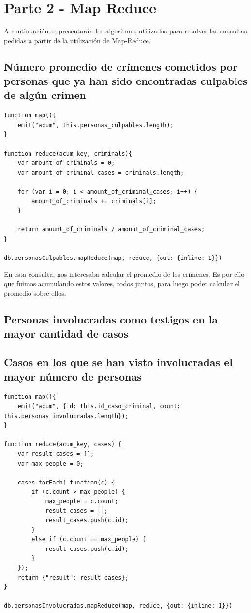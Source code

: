 \documentclass[10pt,a4paper]{article}
\begin{document}
\section{Parte 2 - Map Reduce}
A continuación se presentarán los algoritmos utilizados para resolver las consultas pedidas a partir de la utilización de Map-Reduce.

\subsection{Número promedio de crímenes cometidos por personas que ya han sido encontradas culpables de algún crimen}

\begin{lstlisting}
function map(){
	emit("acum", this.personas_culpables.length);
}

function reduce(acum_key, criminals){
	var amount_of_criminals = 0;
	var amount_of_criminal_cases = criminals.length; 
	
	for (var i = 0; i < amount_of_criminal_cases; i++) {
		amount_of_criminals += criminals[i];
	}

	return amount_of_criminals / amount_of_criminal_cases;
}

db.personasCulpables.mapReduce(map, reduce, {out: {inline: 1}})
\end{lstlisting}

En esta consulta, nos interesaba calcular el promedio de los crímenes. Es por ello que fuimos acumulando estos valores, todos juntos, para luego poder calcular el promedio sobre ellos.

\subsection{Personas involucradas como testigos en la mayor cantidad de casos}

\subsection{Casos en los que se han visto involucradas el mayor número de personas}
\begin{lstlisting}
function map(){
	emit("acum", {id: this.id_caso_criminal, count: this.personas_involucradas.length});
}

function reduce(acum_key, cases) {
	var result_cases = [];
	var max_people = 0;
	
	cases.forEach( function(c) {
		if (c.count > max_people) {
			max_people = c.count;
			result_cases = [];
			result_cases.push(c.id);
		}
		else if (c.count == max_people) {
			result_cases.push(c.id);
		}
	});
	return {"result": result_cases};
}

db.personasInvolucradas.mapReduce(map, reduce, {out: {inline: 1}})
\end{lstlisting}
\end{document}
